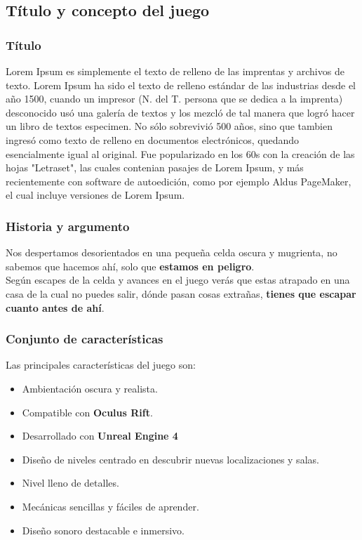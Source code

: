 \subsection{Título y concepto del juego}

\subsubsection{Título}

Lorem Ipsum es simplemente el texto de relleno de las imprentas y archivos de texto. Lorem Ipsum ha sido el texto de relleno estándar de las industrias desde el año 1500, cuando un impresor (N. del T. persona que se dedica a la imprenta) desconocido usó una galería de textos y los mezcló de tal manera que logró hacer un libro de textos especimen. No sólo sobrevivió 500 años, sino que tambien ingresó como texto de relleno en documentos electrónicos, quedando esencialmente igual al original. Fue popularizado en los 60s con la creación de las hojas "Letraset", las cuales contenian pasajes de Lorem Ipsum, y más recientemente con software de autoedición, como por ejemplo Aldus PageMaker, el cual incluye versiones de Lorem Ipsum.
\\

\subsubsection{Historia y argumento}

Nos despertamos desorientados en una pequeña celda oscura y mugrienta, no sabemos que hacemos ahí, solo que\textbf{ estamos en peligro}.
\\

Según escapes de la celda y avances en el juego verás que estas atrapado en una casa de la cual no puedes salir, dónde pasan cosas extrañas, \textbf{tienes que escapar cuanto antes de ahí}.

\subsubsection{Conjunto de características}

Las principales características del juego son:

\begin{itemize}
	\item Ambientación oscura y realista.
	\item Compatible con \textbf{Oculus Rift}.
	\item Desarrollado con \textbf{Unreal Engine 4}
	\item Diseño de niveles centrado en descubrir nuevas localizaciones y salas.
	\item Nivel lleno de detalles.
	\item Mecánicas sencillas y fáciles de aprender.
	\item Diseño sonoro destacable e inmersivo.
\end{itemize}



